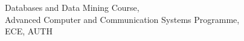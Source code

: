 \begin{center}
\large{Databases and Data Mining Course,\\ Advanced Computer and Communication Systems Programme,\\ ECE, AUTH}
\end{center}